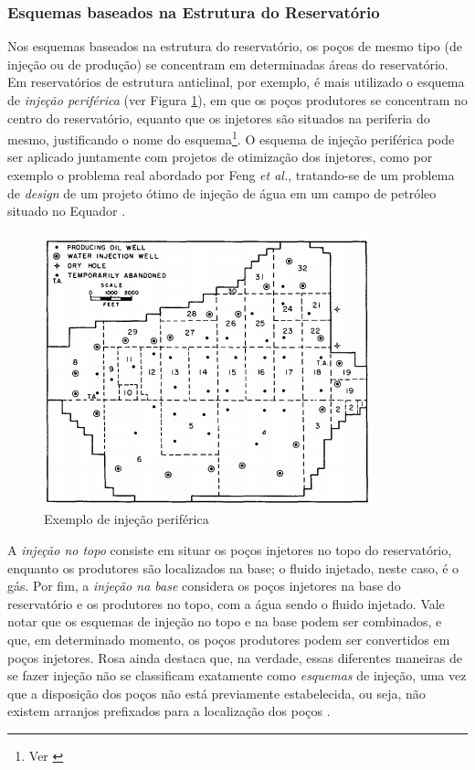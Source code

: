 \subsubsection{Esquemas baseados na Estrutura do Reservat\'{o}rio}
Nos esquemas baseados na estrutura do reservat\'{o}rio, os po\c{c}os de mesmo tipo (de inje\c{c}\~{a}o ou de produ\c{c}\~{a}o) se concentram em determinadas \'{a}reas do reservat\'{o}rio. Em reservat\'{o}rios de estrutura anticlinal, por exemplo, \'{e} mais utilizado o esquema de \textit{inje\c{c}\~{a}o perif\'{e}rica} (ver Figura \ref{fig:injperi}), em que os po\c{c}os produtores se concentram no centro do reservat\'{o}rio, equanto que os injetores s\~{a}o situados na periferia do mesmo, justificando o nome do esquema\footnote{Ver \cite[p. 565]{engres}}. O esquema de inje\c{c}\~{a}o perif\'{e}rica pode ser aplicado juntamente com projetos de otimiza\c{c}\~{a}o dos injetores, como por exemplo o problema real abordado por Feng \textit{et al.}, tratando-se de um problema de \textit{design} de um projeto \'{o}timo de inje\c{c}\~{a}o de \'{a}gua em um campo de petr\'{o}leo situado no Equador \cite{feng2015}. 

\begin{figure}[!ht]
	\centering
	\includegraphics[width=.6\textwidth]{figs/revisao/revisao_injperi}
	\caption{Exemplo de inje\c{c}\~{a}o perif\'{e}rica \cite{stephens1960}\label{fig:injperi}}
\end{figure}

A \textit{inje\c{c}\~{a}o no topo} consiste em situar os po\c{c}os injetores no topo do reservat\'{o}rio, enquanto os produtores s\~{a}o localizados na base; o fluido injetado, neste caso, \'{e} o g\'{a}s. Por fim, a \textit{inje\c{c}\~{a}o na base} considera os po\c{c}os injetores na base do reservat\'{o}rio e os produtores no topo, com a \'{a}gua sendo o fluido injetado. Vale notar que os esquemas de inje\c{c}\~{a}o no topo e na base podem ser combinados, e que, em determinado momento, os po\c{c}os produtores podem ser convertidos em po\c{c}os injetores. Rosa ainda destaca que, na verdade, essas diferentes maneiras de se fazer inje\c{c}\~{a}o n\~{a}o se classificam exatamente como
\textit{esquemas} de inje\c{c}\~{a}o, uma vez que a disposi\c{c}\~{a}o dos po\c{c}os n\~{a}o est\'{a} previamente estabelecida, ou seja, n\~{a}o existem arranjos prefixados para a localiza\c{c}\~{a}o dos po\c{c}os \cite[p. 566]{engres}.


